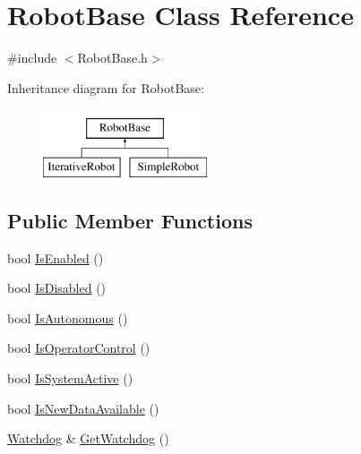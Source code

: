 \hypertarget{classRobotBase}{\section{\-Robot\-Base \-Class \-Reference}
\label{classRobotBase}
}


{\ttfamily \#include $<$\-Robot\-Base.\-h$>$}

\-Inheritance diagram for \-Robot\-Base\-:\begin{figure}[H]
\begin{center}
\leavevmode
\includegraphics[height=2.000000cm]{classRobotBase}
\end{center}
\end{figure}
\subsection*{\-Public \-Member \-Functions}
\begin{DoxyCompactItemize}
\item 
bool \hyperlink{classRobotBase_a597e7b256dd4a950ff25e1823df5f2ae}{\-Is\-Enabled} ()
\item 
bool \hyperlink{classRobotBase_a75fb5e396eaee765e65d3bf24d5c2a08}{\-Is\-Disabled} ()
\item 
bool \hyperlink{classRobotBase_a9eac80c5e53650e1e3e26e7b5f8cb5aa}{\-Is\-Autonomous} ()
\item 
bool \hyperlink{classRobotBase_a05c699856acfe35b0ffb2172c39e23de}{\-Is\-Operator\-Control} ()
\item 
bool \hyperlink{classRobotBase_aa1e72e03aece3b789a65aa1b2d0f6ab7}{\-Is\-System\-Active} ()
\item 
bool \hyperlink{classRobotBase_aab2d7bd7aeb6567097498284a9509ecb}{\-Is\-New\-Data\-Available} ()
\item 
\hyperlink{classWatchdog}{\-Watchdog} \& \hyperlink{classRobotBase_a2d6b5704b1f1de8ec4a78db9ee64d2d2}{\-Get\-Watchdog} ()
\end{DoxyCompactItemize}
